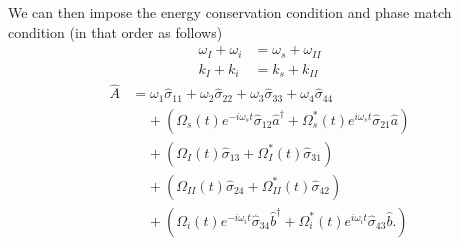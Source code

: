 \documentclass[aps,pra,showpacs,amsmath,amssymb,nofootinbib,longbibliography,superscriptaddress
]{revtex4-1}
\theoremstyle{definition}
\theoremstyle{remark}
\newcommand{\0}{\hat{0}}
\begin{document}
We can then impose the energy conservation condition and phase match condition (in that order as follows)
\begin{align}
    \omega_I + \omega_i &= \omega_s + \omega_{II}\\
    k_I + k_i &= k_s + k_{II}
\end{align}
\begin{align}
    \hat{A}
    &=
    \omega_1 \hat{\sigma}_{11} + \omega_2 \hat{\sigma}_{22} + \omega_3 \hat{\sigma}_{33} + \omega_4 \hat{\sigma}_{44} \nonumber \\
    &\;\;\;\;+
    \left(
        \Omega_{s}(t) e^{-i \omega_s t} \hat{\sigma}_{12} \hat{a}^{\dagger} +
        \Omega_{s}^*(t) e^{i \omega_s t} \hat{\sigma}_{21} \hat{a}
    \right)\nonumber \\
    &\;\;\;\;+
    \left(
        \Omega_{I}(t) \hat{\sigma}_{13} +
        \Omega_{I}^*(t) \hat{\sigma}_{31}
    \right)\nonumber \\
    &\;\;\;\;+
    \left(
        \Omega_{II}(t) \hat{\sigma}_{24} +
        \Omega_{II}^*(t) \hat{\sigma}_{42}
    \right)\nonumber \\
    &\;\;\;\;+
    \left(
        \Omega_{i}(t) e^{-i\omega_i t} \hat{\sigma}_{34} \hat{b}^{\dagger} +
        \Omega_{i}^*(t) e^{i\omega_i t} \hat{\sigma}_{43} \hat{b}.
    \right)
\end{align}
\end{document}
